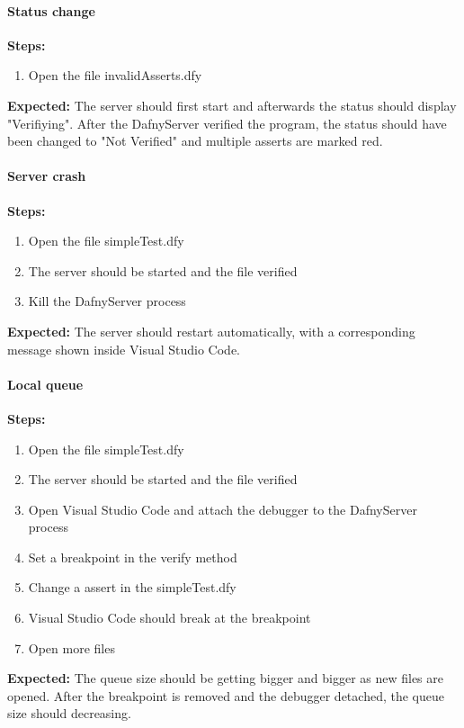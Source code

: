 \paragraph{Status change}
\textbf{\newline Steps:}
\begin{enumerate}
	\item Open the file invalidAsserts.dfy

\end{enumerate}
\textbf{\newline Expected:}
The server should first start and afterwards the status should display "Verifiying". After the DafnyServer verified the program, the status should have been changed to "Not Verified" and multiple asserts are marked red. 

\paragraph{Server crash}
\textbf{\newline Steps:}
\begin{enumerate}
	\item Open the file simpleTest.dfy
	\item The server should be started and the file verified
	\item Kill the DafnyServer process
\end{enumerate}
\textbf{\newline Expected:}
The server should restart automatically, with a corresponding message shown inside Visual Studio Code. 


\paragraph{Local queue}
\textbf{\newline Steps:}
\begin{enumerate}
	\item Open the file simpleTest.dfy
	\item The server should be started and the file verified
	\item Open Visual Studio Code and attach the debugger to the DafnyServer process
	\item Set a breakpoint in the verify method
	\item Change a assert in the simpleTest.dfy 
	\item Visual Studio Code should break at the breakpoint
	\item Open more files
\end{enumerate}
\textbf{\newline Expected:}
The queue size should be getting bigger and bigger as new files are opened. After the breakpoint is removed and the debugger detached, the queue size should decreasing. 

